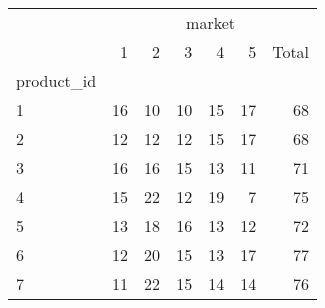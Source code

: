 \documentclass{article}
\begin{document}
\begin{table}[!h]
\centering
\begin{tabular}{lllllll}
\cline{1-7}
\multicolumn{1}{c}{} &
  \multicolumn{6}{|c}{market} \\
\multicolumn{1}{c}{} &
  \multicolumn{1}{|r}{1} &
  \multicolumn{1}{r}{2} &
  \multicolumn{1}{r}{3} &
  \multicolumn{1}{r}{4} &
  \multicolumn{1}{r}{5} &
  \multicolumn{1}{r}{Total} \\
\cline{1-7}
\multicolumn{1}{l}{product\_id} &
  \multicolumn{1}{|r}{} &
  \multicolumn{1}{r}{} &
  \multicolumn{1}{r}{} &
  \multicolumn{1}{r}{} &
  \multicolumn{1}{r}{} &
  \multicolumn{1}{r}{} \\
\multicolumn{1}{l}{\hspace{1em}1} &
  \multicolumn{1}{|r}{16} &
  \multicolumn{1}{r}{10} &
  \multicolumn{1}{r}{10} &
  \multicolumn{1}{r}{15} &
  \multicolumn{1}{r}{17} &
  \multicolumn{1}{r}{68} \\
\multicolumn{1}{l}{\hspace{1em}2} &
  \multicolumn{1}{|r}{12} &
  \multicolumn{1}{r}{12} &
  \multicolumn{1}{r}{12} &
  \multicolumn{1}{r}{15} &
  \multicolumn{1}{r}{17} &
  \multicolumn{1}{r}{68} \\
\multicolumn{1}{l}{\hspace{1em}3} &
  \multicolumn{1}{|r}{16} &
  \multicolumn{1}{r}{16} &
  \multicolumn{1}{r}{15} &
  \multicolumn{1}{r}{13} &
  \multicolumn{1}{r}{11} &
  \multicolumn{1}{r}{71} \\
\multicolumn{1}{l}{\hspace{1em}4} &
  \multicolumn{1}{|r}{15} &
  \multicolumn{1}{r}{22} &
  \multicolumn{1}{r}{12} &
  \multicolumn{1}{r}{19} &
  \multicolumn{1}{r}{7} &
  \multicolumn{1}{r}{75} \\
\multicolumn{1}{l}{\hspace{1em}5} &
  \multicolumn{1}{|r}{13} &
  \multicolumn{1}{r}{18} &
  \multicolumn{1}{r}{16} &
  \multicolumn{1}{r}{13} &
  \multicolumn{1}{r}{12} &
  \multicolumn{1}{r}{72} \\
\multicolumn{1}{l}{\hspace{1em}6} &
  \multicolumn{1}{|r}{12} &
  \multicolumn{1}{r}{20} &
  \multicolumn{1}{r}{15} &
  \multicolumn{1}{r}{13} &
  \multicolumn{1}{r}{17} &
  \multicolumn{1}{r}{77} \\
\multicolumn{1}{l}{\hspace{1em}7} &
  \multicolumn{1}{|r}{11} &
  \multicolumn{1}{r}{22} &
  \multicolumn{1}{r}{15} &
  \multicolumn{1}{r}{14} &
  \multicolumn{1}{r}{14} &
  \multicolumn{1}{r}{76} \\

\end{tabular}
\end{table}
\end{document}
